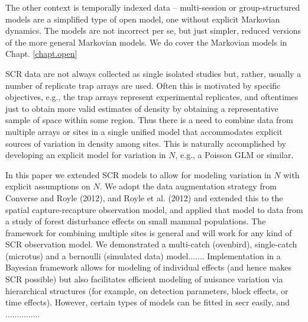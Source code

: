 The other context is temporally indexed data -- multi-session or
group-structured models are a simplified type of open model, one
without explicit Markovian dynamics. The models are not incorrect per
se, but just simpler, reduced versions of the more general Markovian
models. We do cover the Markovian models in Chapt. \ref{chapt.open}


SCR data are not
always collected as single isolated studies but, rather, usually a number of
replicate trap arrays are used. Often this is motivated by specific
objectives, e.g., the trap arrays represent experimental replicates,
and oftentimes just to obtain more valid estimates of density by
obtaining a representative sample of space within some region.  Thus
there is a need to combine data from multiple arrays or sites in a
single unified model that accommodates explicit sources of variation
in density among sites.  This is naturally accomplished by developing
an explicit model for variation in $N$, e.g., a Poisson GLM or
similar.

In this paper we extended SCR models to allow for modeling variation
in $N$ with explicit assumptions on $N$. We adopt the data
augmentation strategy from Converse and Royle (2012), and Royle et
al. (2012) and extended this to the spatial capture-recapture
observation model, and applied that model to data from a study of
forest disturbance effects on small mammal populations.  
The framework for combining multiple sites is general and will
work for any kind of SCR observation model.
We demonstrated a multi-catch (ovenbird), single-catch (microtus)
and a bernoulli (simulated data) model.......
Implementation in a Bayesian framework allows for modeling
of individual effects (and hence makes SCR possible) but also
facilitates efficient modeling of nuisance variation via hierarchical
structures (for example, on detection parameters, block effects, or
time effects). However, certain types of models can be fitted in secr
easily, and ...............


